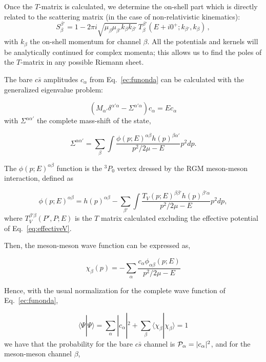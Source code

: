 \documentclass[aps, prd, floatfix, twocolumn, superscriptaddress, nofootinbib]{revtex4-1}
\begin{document}
Once the $T$-matrix is calculated, we determine the on-shell part which is directly related to the scattering matrix (in the case of non-relativistic kinematics):
\begin{equation}
S_{\beta}^{\beta'} = 1 - 2\pi i
\sqrt{\mu_{\beta}\mu_{\beta'}k_{\beta}k_{\beta'}} \,
T_{\beta}^{\beta'}(E+i0^{+};k_{\beta'},k_{\beta}) \,,
\end{equation}
with $k_{\beta}$ the on-shell momentum for channel $\beta$.
All the potentials and kernels will be analytically continued for complex momenta; this allows us to find the poles of the $T$-matrix in any possible Riemann sheet.

The bare $c\bar s$ amplitudes $c_\alpha$ from Eq.~\eqref{ec:funonda} can be calculated with the generalized eigenvalue problem:

\begin{equation}
 \left(M_{\alpha'}\delta^{\alpha'\alpha}-\Sigma^{\alpha'\alpha}\right)c_\alpha = Ec_\alpha
\end{equation}
%
with $\Sigma^{\alpha\alpha'}$ the complete mass-shift of the state,

\begin{equation}
 \Sigma^{\alpha\alpha'}=\sum_\beta \int \frac{\phi(p;E)^{\alpha\beta}h(p)^{\beta\alpha'}}{p^2/2\mu-E}p^2dp.
\end{equation}

The $\phi(p;E)^{\alpha\beta}$ function is the $^3P_0$ vertex dressed by the RGM
meson-meson interaction, defined as~\cite{Ortega:2012rs}

\begin{equation}
 \phi(p;E)^{\alpha\beta}=h(p)^{\alpha\beta}-\sum_{\beta'}\int \frac{T_V(p;E)^{\beta\beta'}h(p)^{\beta'\alpha}}{p^2/2\mu-E} p^2dp,
\end{equation}
%
 where $T^{\beta'\beta}_V(P',P;E)$ is the $T$ matrix calculated excluding the
effective potential of Eq.~\eqref{eq:effectiveV}.

Then, the meson-meson wave function can be expressed as,

\begin{equation}
 \chi_\beta(p)=-\sum_\alpha\frac{c_\alpha\phi_{\alpha\beta}(p;E)}{p^2/2\mu-E}
\end{equation}

Hence, with the usual normalization for the complete wave function of Eq.~\eqref{ec:funonda},

\begin{equation}
\langle \Psi | \Psi \rangle=\sum_\alpha |c_\alpha|^2+\sum_\beta \langle\chi_\beta|\chi_\beta\rangle=1
\end{equation}
%
we have that the probability for the bare $c\bar s$ channel is ${\cal P}_\alpha=| c_\alpha|^2$, and for the meson-meson channel $\beta$,
\end{document}
